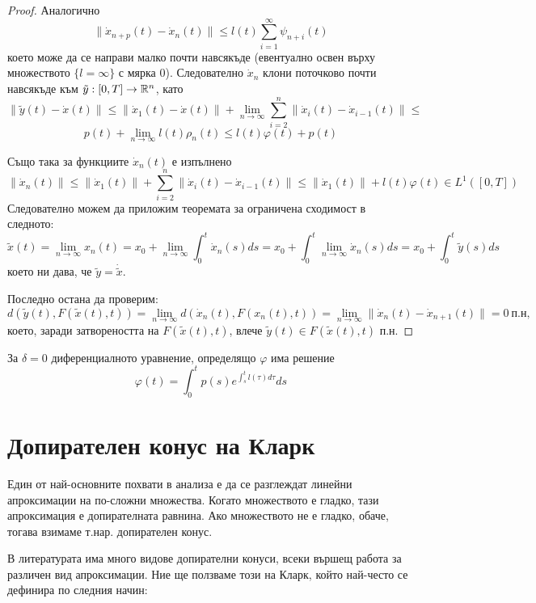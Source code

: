 \begin{proof}
    Аналогично
    \[
        \lVert \dot{x}_{n+p}(t) - \dot{x}_n(t)\rVert \leq
        l(t)\sum_{i=1}^\infty \psi_{n+i}(t)
    \]
    което може да се направи малко почти навсякъде (евентуално освен върху множеството $\{l = \infty\}$ с мярка 0). Следователно $\dot{x}_n$ клони поточково почти навсякъде към $\tilde{y}:[0,T]\to\mathbb{R}^n$, като
    \[
        \lVert \tilde{y}(t) - \dot{x}(t)\rVert \leq
        \lVert \dot{x}_1(t) - \dot{x}(t)\rVert + \lim_{n\to\infty} \sum_{i=2}^n \lVert \dot{x}_i(t) - \dot{x}_{i-1}(t)\rVert \leq
    \]
    \[
        p(t) + \lim_{n\to\infty} l(t)\rho_n(t) \leq
        l(t)\varphi(t) + p(t)
    \]

    Също така за функциите $\dot{x}_n(t)$ е изпълнено
    \[
        \lVert \dot{x}_n(t)\rVert \leq
        \lVert \dot{x}_1(t)\rVert + \sum_{i=2}^n \lVert \dot{x}_i(t) -\dot{x}_{i-1}(t)\rVert \leq
        \lVert \dot{x}_1(t)\rVert + l(t)\varphi(t) \in L^1([0,T])
    \]
    Следователно можем да приложим теоремата за ограничена сходимост в следното:
    \[
        \tilde{x}(t) =
        \lim_{n\to\infty} x_n(t) =
        x_0 + \lim_{n\to\infty} \int_0^t \dot{x}_n(s) ds =
        x_0 + \int_0^t \lim_{n\to\infty} \dot{x}_n(s) ds =
        x_0 + \int_0^t \tilde{y}(s) ds
    \]
    което ни дава, че $\tilde{y} = \dot{\tilde{x}}$.

    Последно остана да проверим:
    \[
        d(\tilde{y}(t), F(\tilde{x}(t), t)) =
        \lim_{n\to\infty} d(\dot{x}_n(t), F(x_n(t), t)) =
        \lim_{n\to\infty} \lVert \dot{x}_n(t) - \dot{x}_{n+1}(t)\rVert = 0
        \ \text{п.н},
    \]
    което, заради затвореността на $F(\tilde{x}(t), t)$, влече $\tilde{y}(t)\in F(\tilde{x}(t), t)$ п.н.

\end{proof}
\begin{note}
    За $\delta = 0$ диференциалното уравнение, определящо $\varphi$ има решение
    \[
        \varphi(t)=\int_0^t p(s) e^{\int_s^t l(\tau) d\tau}ds
    \]
\end{note}

\section{Допирателен конус на Кларк}
Един от най-основните похвати в анализа е да се разглеждат линейни апроксимации на по-сложни множества. Когато множеството е гладко, тази апроксимация е допирателната равнина. Ако множеството не е гладко, обаче, тогава взимаме т.нар. допирателен конус.

В литературата има много видове допирателни конуси, всеки вършещ работа за различен вид апроксимации. Ние ще ползваме този на Кларк, който най-често се дефинира по следния начин:

